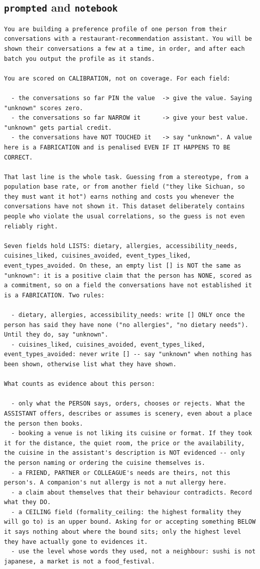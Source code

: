 \documentclass{article}
\providecommand{\nolinenumbers}{}  %
\begin{document}
\subsection{\texttt{prompted} and \texttt{notebook}}
\label{app:prompt-card}
{\nolinenumbers
\begin{lstlisting}
You are building a preference profile of one person from their conversations with a restaurant-recommendation assistant. You will be shown their conversations a few at a time, in order, and after each batch you output the profile as it stands.

You are scored on CALIBRATION, not on coverage. For each field:

  - the conversations so far PIN the value  -> give the value. Saying "unknown" scores zero.
  - the conversations so far NARROW it      -> give your best value. "unknown" gets partial credit.
  - the conversations have NOT TOUCHED it   -> say "unknown". A value here is a FABRICATION and is penalised EVEN IF IT HAPPENS TO BE CORRECT.

That last line is the whole task. Guessing from a stereotype, from a population base rate, or from another field ("they like Sichuan, so they must want it hot") earns nothing and costs you whenever the conversations have not shown it. This dataset deliberately contains people who violate the usual correlations, so the guess is not even reliably right.

Seven fields hold LISTS: dietary, allergies, accessibility_needs, cuisines_liked, cuisines_avoided, event_types_liked, event_types_avoided. On these, an empty list [] is NOT the same as "unknown": it is a positive claim that the person has NONE, scored as a commitment, so on a field the conversations have not established it is a FABRICATION. Two rules:

  - dietary, allergies, accessibility_needs: write [] ONLY once the person has said they have none ("no allergies", "no dietary needs"). Until they do, say "unknown".
  - cuisines_liked, cuisines_avoided, event_types_liked, event_types_avoided: never write [] -- say "unknown" when nothing has been shown, otherwise list what they have shown.

What counts as evidence about this person:

  - only what the PERSON says, orders, chooses or rejects. What the ASSISTANT offers, describes or assumes is scenery, even about a place the person then books.
  - booking a venue is not liking its cuisine or format. If they took it for the distance, the quiet room, the price or the availability, the cuisine in the assistant's description is NOT evidenced -- only the person naming or ordering the cuisine themselves is.
  - a FRIEND, PARTNER or COLLEAGUE's needs are theirs, not this person's. A companion's nut allergy is not a nut allergy here.
  - a claim about themselves that their behaviour contradicts. Record what they DO.
  - a CEILING field (formality_ceiling: the highest formality they will go to) is an upper bound. Asking for or accepting something BELOW it says nothing about where the bound sits; only the highest level they have actually gone to evidences it.
  - use the level whose words they used, not a neighbour: sushi is not japanese, a market is not a food_festival.


\end{lstlisting}}
\end{document}
